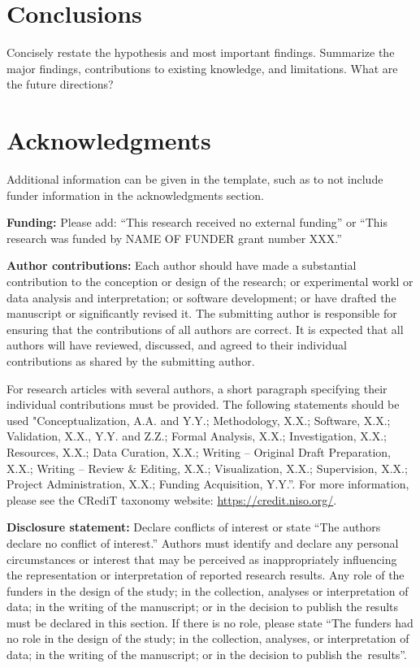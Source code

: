 \documentclass[article,accept,moreauthors,pdftex]{Definitions/TESEA}
\begin{document}
\section{Conclusions}
Concisely restate the hypothesis and most important findings. Summarize the major findings, contributions to existing knowledge, and limitations. What are the future directions?


\section*{Acknowledgments}

Additional information can be given in the template, such as to not include funder information in the acknowledgments section.

\vspace{12pt}

\noindent \textbf{Funding:} Please add: “This research received no external funding” or “This research was funded by NAME OF FUNDER grant number XXX.”

\vspace{12pt}

\noindent \textbf{Author contributions:} Each author should have made a substantial contribution to the conception or design of the research; or experimental workl or data analysis and interpretation; or software development; or have drafted the manuscript or significantly revised it. The submitting author is responsible for ensuring that the contributions of all authors are correct. It is expected that all authors will have reviewed, discussed, and agreed to their individual contributions as shared by the submitting author. 

For research articles with several authors, a short paragraph specifying their individual contributions must be provided. The following statements should be used "Conceptualization, A.A. and Y.Y.; Methodology, X.X.; Software, X.X.; Validation, X.X., Y.Y. and Z.Z.; Formal Analysis, X.X.; Investigation, X.X.; Resources, X.X.; Data Curation, X.X.; Writing – Original Draft Preparation, X.X.; Writing – Review \& Editing, X.X.; Visualization, X.X.; Supervision, X.X.; Project Administration, X.X.; Funding Acquisition, Y.Y.”. For more information, please see the CRediT taxonomy website: \url{https://credit.niso.org/}.


\vspace{12pt}

\noindent \textbf{Disclosure statement:} Declare conflicts of interest or state ``The authors declare no conflict of interest.'' Authors must identify and declare any personal circumstances or interest that may be perceived as inappropriately influencing the representation or interpretation of reported research results. Any role of the funders in the design of the study; in the collection, analyses or interpretation of data; in the writing of the manuscript; or in the decision to publish the results must be declared in this section. If there is no role, please state ``The funders had no role in the design of the study; in the collection, analyses, or interpretation of data; in the writing of the manuscript; or in the decision to publish the~results''.
	


	
\end{document}

